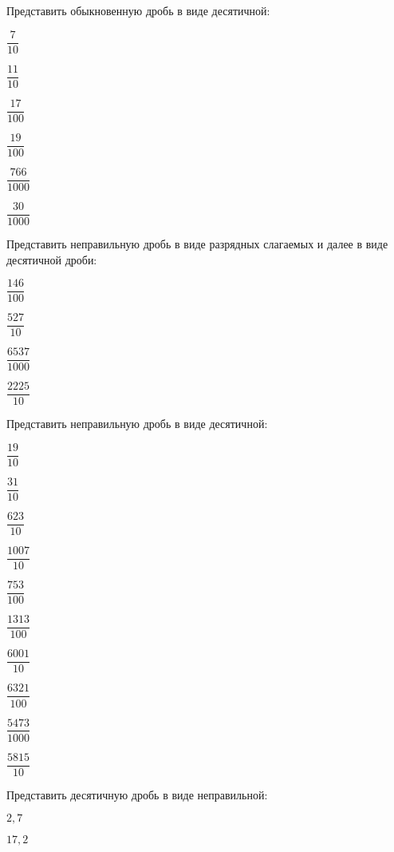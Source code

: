 \begin{class}[number=2]
		\begin{listofex}
			\item Представить обыкновенную дробь в виде десятичной:
			\begin{enumcols}[itemcolumns=6]
				\item \( \dfrac{7}{10} \)
				\item \( \dfrac{11}{10} \)
				\item \( \dfrac{17}{100} \)
				\item \( \dfrac{19}{100} \)
				\item \( \dfrac{766}{1000} \)
				\item \( \dfrac{30}{1000} \)
			\end{enumcols}
			\item Представить неправильную дробь в виде разрядных слагаемых и далее в виде десятичной дроби:
			\begin{enumcols}[itemcolumns=4]
				\item \( \dfrac{146}{100} \)
				\item \( \dfrac{527}{10} \)
				\item \( \dfrac{6537}{1000} \)
				\item \( \dfrac{2225}{10} \)
			\end{enumcols}
			\item Представить неправильную дробь в виде десятичной:
			\begin{enumcols}[itemcolumns=5]
				\item \( \dfrac{19}{10} \)
				\item \( \dfrac{31}{10} \)
				\item \( \dfrac{623}{10} \)
				\item \( \dfrac{1007}{10} \)
				\item \( \dfrac{753}{100} \)
				\item \( \dfrac{1313}{100} \)
				\item \( \dfrac{6001}{10} \)
				\item \( \dfrac{6321}{100} \)
				\item \( \dfrac{5473}{1000} \)
				\item \( \dfrac{5815}{10} \)
			\end{enumcols}
			\item Представить десятичную дробь в виде неправильной:
			\begin{enumcols}[itemcolumns=6]
				\item \( 2,7 \)
				\item \( 17,2 \)

\end{enumcols}
\end{listofex}
\end{class}
